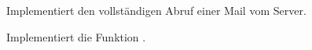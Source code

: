 \documentclass[10pt, a4paper]{scrartcl}
\begin{document}
\begin{aufgabe}[symbol=\symPartner\,\symLaptop]
	Implementiert den vollständigen Abruf einer Mail vom Server.
\end{aufgabe}

\begin{aufgabe}[symbol=\symStern\,\symPartner\,\symLaptop]
	Implementiert die Funktion .
\end{aufgabe}
\end{document}
